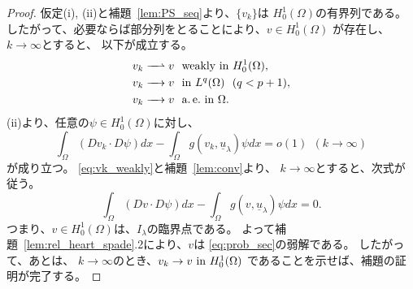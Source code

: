 \begin{proof}
 仮定(i), (ii)と補題~\ref{lem:PS_seq}より、$\{v_k \}$は
 $H_0^1(\Omega)$の有界列である。
 したがって、必要ならば部分列をとることにより、$v \in H_0^1(\Omega)$
 が存在し、$k \to \infty$とすると、
 以下が成立する。
 \begin{align}
  v_k \xrightharpoonup{ \mbox{ ~ } } v & \ \ \text{weakly~} \tin
  H_0^1(\Omega), \label{eq:vk_weakly} \\
  v_k \xrightarrow{ \mbox{ ~ } } v & \ \ \tin L^q(\Omega) \ \
   (q < p+1), \label{eq:vk_Lq} \\
  v_k \xrightarrow{ \mbox{ ~ } } v & \ \ \ae \tin \Omega. 
    \label{eq:vk_ae}
 \end{align}
 (ii)より、任意の$\psi \in H_0^1(\Omega)$に対し、
 \[
 \int_\Omega (Dv_k \cdot D\psi) dx - \int_\Omega g(v_k,
 \underline{u}_\lambda) \psi dx = o(1) \ \ (k \to \infty)
 \]
 が成り立つ。
 \eqref{eq:vk_weakly}と補題~\ref{lem:conv}より、
 $k \to \infty$とすると、次式が従う。
 \begin{equation}
  \int_\Omega (Dv \cdot D\psi) dx - \int_\Omega g(v,
   \underline{u}_\lambda) \psi dx = 0. \label{eq:intvpsi}
 \end{equation}
 つまり、$v \in H_0^1(\Omega)$は、$I_\lambda$の臨界点である。
 よって補題~\ref{lem:rel_heart_spade}.2により、$v$は
 \ref{eq:prob_sec}の弱解である。
 したがって、あとは、
 $k \to \infty$のとき、$v_k \to v ~\text{in}~ H_0^1(\Omega)$
 であることを示せば、補題の証明が完了する。


\end{proof}
